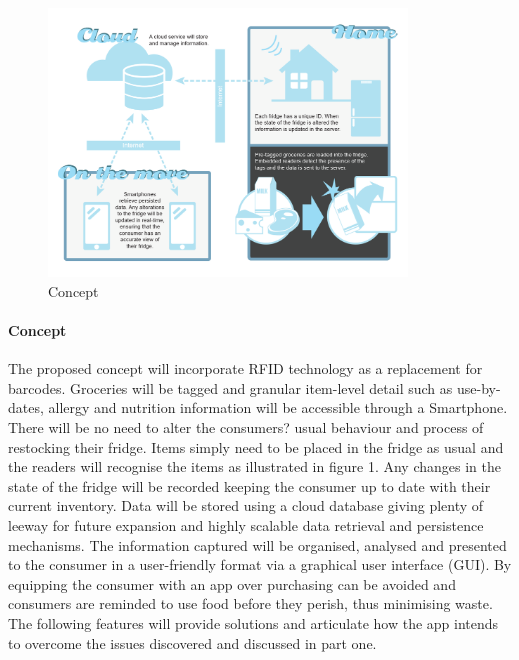 \documentclass[a4paper, 11pt]{article}
\begin{document}
\begin{figure}[h!]
  \centering
    \includegraphics[width=0.85\textwidth]{system2.png}
      \caption{Concept}
\end{figure}

\paragraph{Concept}The proposed concept will incorporate RFID technology as a replacement for barcodes. Groceries will be tagged and granular item-level detail such as use-by-dates, allergy and nutrition information will be accessible through a Smartphone. There will be no need to alter the consumers?  usual behaviour and process of restocking their fridge. Items simply need to be placed in the fridge as usual and the readers will recognise the items as illustrated in figure 1. Any changes in the state of the fridge will be recorded keeping the consumer up to date with their current inventory. Data will be stored using a cloud database giving plenty of leeway for future expansion and highly scalable data retrieval and persistence mechanisms. The information captured will be organised, analysed and presented to the consumer in a user-friendly format via a graphical user interface (GUI). By equipping the consumer with an app over purchasing can be avoided and consumers are reminded to use food before they perish, thus minimising waste. The following features will provide solutions and articulate how the app intends to overcome the issues discovered and discussed in part one.

\vspace{\baselineskip}
\end{document}
